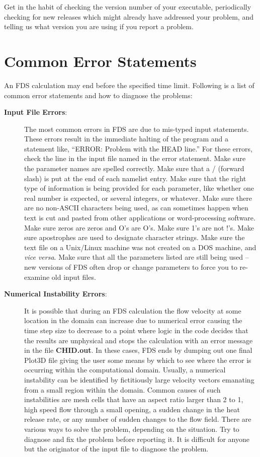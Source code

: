 \documentclass[11pt]{book}
\begin{document}
Get in the habit of checking the version number of your executable, periodically checking for new releases which
might already have addressed your problem, and telling us what version you are using if you report a problem.





\section{Common Error Statements}

An FDS calculation may end before the specified time limit.
Following is a list of common error statements and how to diagnose the problems:
\begin{description}
\item[{\bf Input File Errors}:]
The most common errors in FDS are due to mis-typed input statements.
These errors result in the immediate halting of the program and a statement like, ``ERROR: Problem
with the HEAD line.'' For these errors, check the line in the input file named in the error statement.
Make sure the parameter names are spelled correctly. Make sure that a / (forward slash)
is put at the end of each namelist entry. Make sure that the right type of information is
being provided for each parameter, like whether one real number is expected, or several integers, or
whatever. Make sure there are no non-ASCII characters being used, as can sometimes happen when text is
cut and pasted from other applications or word-processing software. Make sure zeros are zeros and
O's are O's. Make sure 1's are not !'s. Make sure apostrophes are used to designate character strings.
Make sure the text file on a Unix/Linux machine was not created on a DOS machine, and {\em vice versa}.
Make sure that all the parameters listed are still being used -- new versions of FDS often drop or
change parameters to force you to re-examine old input files.

\item [{\bf Numerical Instability Errors}:]
It is possible that during an FDS calculation the flow
velocity at some location in the domain can increase due to numerical error causing the time step
size to decrease to a point where logic in the code decides that the results are unphysical
and stops the calculation with an error message in the file {\bf CHID.out}.
In these cases, FDS ends by dumping out one final
Plot3D file giving the user some means by which to see where the
error is occurring within the computational domain. Usually, a numerical
instability can be identified by fictitiously large velocity vectors emanating from
a small region within the domain. Common causes of such instabilities are
mesh cells that have an aspect ratio larger than 2 to 1, high speed flow through a small
opening, a sudden change in the heat release rate, or any number of sudden changes to the
flow field. There are various ways to solve the problem, depending on the situation.
Try to diagnose and fix the problem before reporting it. It is difficult
for anyone but the originator of the input file to diagnose the problem.


\end{description}
\end{document}
